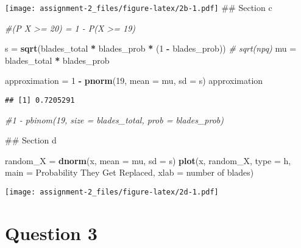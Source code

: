 \documentclass[
]{article}
\newenvironment{Shaded}{\begin{snugshade}}{\end{snugshade}}
\newcommand{\AttributeTok}[1]{\textcolor[rgb]{0.13,0.29,0.53}{#1}}
\newcommand{\CommentTok}[1]{\textcolor[rgb]{0.56,0.35,0.01}{\textit{#1}}}
\newcommand{\DecValTok}[1]{\textcolor[rgb]{0.00,0.00,0.81}{#1}}
\newcommand{\FunctionTok}[1]{\textcolor[rgb]{0.13,0.29,0.53}{\textbf{#1}}}
\newcommand{\NormalTok}[1]{#1}
\newcommand{\OtherTok}[1]{\textcolor[rgb]{0.56,0.35,0.01}{#1}}
\newcommand{\SpecialCharTok}[1]{\textcolor[rgb]{0.81,0.36,0.00}{\textbf{#1}}}
\newcommand{\StringTok}[1]{\textcolor[rgb]{0.31,0.60,0.02}{#1}}
\begin{document}
\texttt{[image: assignment-2\_files/figure-latex/2b-1.pdf]} \#\# Section
c

\begin{Shaded}
\begin{Highlighting}[]
  \CommentTok{\#(P X \textgreater{}= 20) = 1 {-} P(X \textgreater{}= 19)}
  
\NormalTok{  s }\OtherTok{=} \FunctionTok{sqrt}\NormalTok{(blades\_total }\SpecialCharTok{*}\NormalTok{ blades\_prob }\SpecialCharTok{*}\NormalTok{ (}\DecValTok{1} \SpecialCharTok{{-}}\NormalTok{ blades\_prob)) }\CommentTok{\# sqrt(npq)}
\NormalTok{  mu }\OtherTok{=}\NormalTok{ blades\_total }\SpecialCharTok{*}\NormalTok{ blades\_prob}

\NormalTok{  approximation }\OtherTok{=} \DecValTok{1} \SpecialCharTok{{-}} \FunctionTok{pnorm}\NormalTok{(}\DecValTok{19}\NormalTok{, }\AttributeTok{mean =}\NormalTok{ mu, }\AttributeTok{sd =}\NormalTok{ s)}
\NormalTok{  approximation}
\end{Highlighting}
\end{Shaded}

\begin{verbatim}
## [1] 0.7205291
\end{verbatim}

\begin{Shaded}
\begin{Highlighting}[]
  \CommentTok{\#1 {-} pbinom(19, size = blades\_total, prob = blades\_prob)}
\end{Highlighting}
\end{Shaded}

\#\# Section d

\begin{Shaded}
\begin{Highlighting}[]
\NormalTok{    random\_X }\OtherTok{=} \FunctionTok{dnorm}\NormalTok{(x, }\AttributeTok{mean =}\NormalTok{ mu, }\AttributeTok{sd =}\NormalTok{ s)}
    \FunctionTok{plot}\NormalTok{(x, random\_X, }\AttributeTok{type =} \StringTok{\textquotesingle{}h\textquotesingle{}}\NormalTok{,}
     \AttributeTok{main =} \StringTok{\textquotesingle{}Probability They Get Replaced\textquotesingle{}}\NormalTok{,}
     \AttributeTok{xlab =} \StringTok{\textquotesingle{}number of blades\textquotesingle{}}\NormalTok{)}
\end{Highlighting}
\end{Shaded}

\texttt{[image: assignment-2\_files/figure-latex/2d-1.pdf]}

\hypertarget{question-3}{%
\section{Question 3}\label{question-3}}
\end{document}
